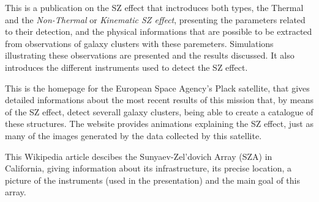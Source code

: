 \documentclass{article}
\begin{document}
\cite{LSS}

This is a publication on the SZ effect that inctroduces both types, the
Thermal and the \emph{Non-Thermal} or \emph{Kinematic SZ effect}, presenting the
parameters related to their detection, and the physical informations that
are possible to be extracted from observations of galaxy clusters with
these paremeters. Simulations illustrating these observations are
presented and the results discussed. It also introduces the different
instruments used to detect the SZ effect. 

\cite{Planck}

This is the homepage for the European Space Agency's Plack satellite,
that gives detailed informations about the most recent results of
this mission that, by means of the SZ effect, detect severall galaxy
clusters, being able to create a catalogue of these structures. The
website provides animations explaining the SZ effect, just as many of
the images generated by the data collected by this satellite. 


\cite{wikipedia}

This Wikipedia article descibes the Sunyaev-Zel'dovich Array (SZA) in
California, giving information about its infrastructure, its precise
location, a picture of the instruments (used in the presentation) and
the main goal of this array. 
\end{document}
